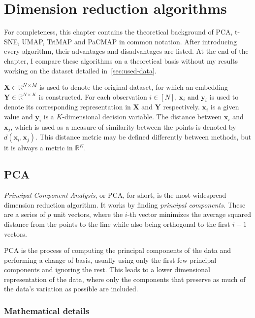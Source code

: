 \chapter{Dimension reduction algorithms}\label{ch:dimension-reduction-algorithms}

For completeness, this chapter contains the theoretical background of PCA, t-SNE, UMAP, TriMAP and PaCMAP in common notation. After introducing every algorithm, their advantages and disadvantages are listed. At the end of the chapter, I compare these algorithms on a theoretical basis without my results working on the dataset detailed in~\ref{sec:used-data}.

$\mathbf{X} \in \mathbb{R}^{N\times M}$ is used to denote the original dataset, for which an embedding $\mathbf{Y} \in \mathbb{R}^{N\times K}$ is constructed. For each observation $i \in [N]$, $\mathbf{x}_i$ and $\mathbf{y}_i$ is used to denote its corresponding representation in $\mathbf{X}$ and $\mathbf{Y}$ respectively. $\mathbf{x}_i$ is a given value and $\mathbf{y}_i$ is a $K$-dimensional decision variable. The distance between $\mathbf{x}_i$ and $\mathbf{x}_j$, which is used as a measure of similarity between the points is denoted by $d(\mathbf{x}_i, \mathbf{x}_j)$. This distance metric may be defined differently between methods, but it is always a metric in $\mathbb{R}^{K}$.

\section{PCA}\label{sec:pca}

\textit{Principal Component Analysis}\cite{bib:pca}, or PCA, for short, is the most widespread dimension reduction algorithm. It works by finding \textit{principal components}. These are a series of $p$ unit vectors, where the $i$-th vector minimizes the average squared distance from the points to the line while also being orthogonal to the first $i - 1$ vectors.

PCA is the process of computing the principal components of the data and performing a change of basis, usually using only the first few principal components and ignoring the rest. This leads to a lower dimensional representation of the data, where only the components that preserve as much of the data's variation as possible are included.

\subsection{Mathematical details}\label{subsec:mathematical-details}


